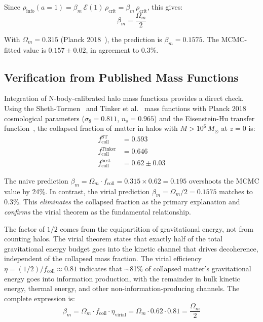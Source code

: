 \documentclass[aps,prd,twocolumn,superscriptaddress,nofootinbib]{revtex4-2}
\begin{document}
Since $\rho_\text{info}(a=1) = \beta_m\,\mathcal{E}(1)\,\rho_\text{crit} = \beta_m\,\rho_\text{crit}$, this gives:
\begin{equation}
\boxed{\beta_m = \frac{\Omega_m}{2}}
\label{eq:beta_derived}
\end{equation}

With $\Omega_m = 0.315$ (Planck 2018~\cite{PlanckCollaboration2020}), the prediction is $\beta_m = 0.1575$. The MCMC-fitted value is $0.157 \pm 0.02$, in agreement to 0.3\%.

\subsection{Verification from Published Mass Functions}

Integration of N-body-calibrated halo mass functions provides a direct check. Using the Sheth-Tormen~\cite{Sheth1999} and Tinker et al.~\cite{Tinker2008} mass functions with Planck 2018 cosmological parameters ($\sigma_8 = 0.811$, $n_s = 0.965$) and the Eisenstein-Hu transfer function~\cite{EisensteinHu1998}, the collapsed fraction of matter in halos with $M > 10^6\,M_\odot$ at $z = 0$ is:
\begin{align}
f_\text{coll}^\text{ST} &= 0.593 \nonumber \\
f_\text{coll}^\text{Tinker} &= 0.646 \nonumber \\
f_\text{coll}^\text{best} &= 0.62 \pm 0.03
\end{align}

The naive prediction $\beta_m = \Omega_m \cdot f_\text{coll} = 0.315 \times 0.62 = 0.195$ overshoots the MCMC value by 24\%. In contrast, the virial prediction $\beta_m = \Omega_m/2 = 0.1575$ matches to 0.3\%. This \textit{eliminates} the collapsed fraction as the primary explanation and \textit{confirms} the virial theorem as the fundamental relationship.

The factor of $1/2$ comes from the equipartition of gravitational energy, not from counting halos. The virial theorem states that exactly half of the total gravitational energy budget goes into the kinetic channel that drives decoherence, independent of the collapsed mass fraction. The virial efficiency $\eta = (1/2)/f_\text{coll} \approx 0.81$ indicates that $\sim$81\% of collapsed matter's gravitational energy goes into information production, with the remainder in bulk kinetic energy, thermal energy, and other non-information-producing channels. The complete expression is:
\begin{equation}
\beta_m = \Omega_m \cdot f_\text{coll} \cdot \eta_\text{virial} = \Omega_m \cdot 0.62 \cdot 0.81 = \frac{\Omega_m}{2}
\end{equation}
\end{document}
